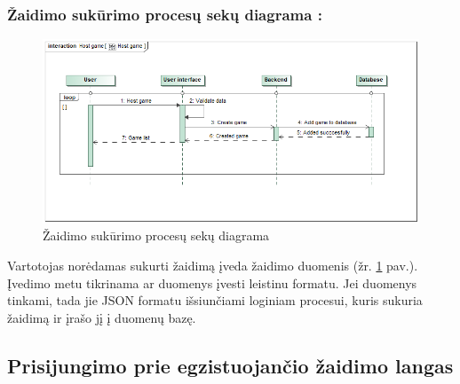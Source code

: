 \documentclass{VUMIFPSkursinis}
\begin{document}
		\subsubsection*{Žaidimo sukūrimo procesų sekų diagrama :}
			\begin{figure}[H]
				\centering
				\includegraphics[scale=0.5]{img/HostGame_sequence}
				\caption{Žaidimo sukūrimo procesų sekų diagrama}
				\label{img:Hostgame_sequence}
			\end{figure}
			Vartotojas norėdamas sukurti žaidimą įveda žaidimo duomenis (žr. \ref{img:Hostgame_sequence} pav.). Įvedimo metu 
			tikrinama ar duomenys įvesti leistinu formatu. Jei duomenys tinkami, tada 
			jie JSON formatu išsiunčiami loginiam procesui, kuris sukuria žaidimą ir 
			įrašo jį į duomenų bazę.	
			
	\subsection{Prisijungimo prie egzistuojančio žaidimo langas}	
\end{document}
